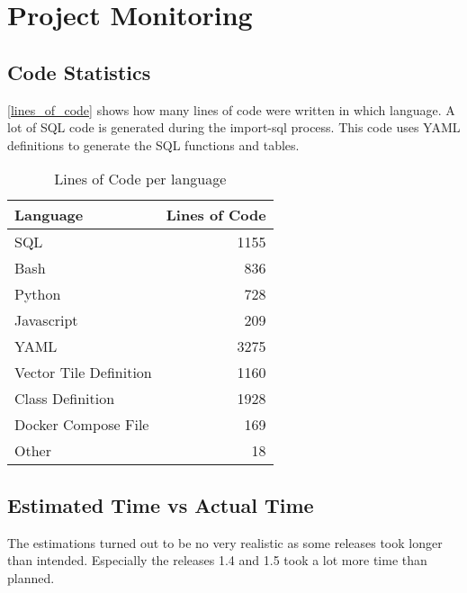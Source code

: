 \chapter{Project Monitoring}\label{project monitoring}

\section{Code Statistics}

\autoref{lines_of_code} shows how many lines of code were written in which language. A lot of SQL code is generated during the import-sql process. This code uses YAML definitions to generate the SQL functions and tables. 

\begin{table}[H]
\centering
\begin{tabular}{lr}
\textbf{Language}   & \multicolumn{1}{l}{\textbf{Lines of Code}} \\ \hline
SQL                     & 1155                              \\
Bash                    & 836                               \\
Python                  & 728                               \\
Javascript              & 209                               \\
YAML                    & 3275                              \\
\noindent\hspace*{8mm}%
Vector Tile Definition  & 1160                              \\
\noindent\hspace*{8mm}%
Class Definition        & 1928                              \\
\noindent\hspace*{8mm}%
Docker Compose File     & 169                               \\
\noindent\hspace*{8mm}%
Other                   & 18
\end{tabular}
\caption{Lines of Code per language}
\label{lines_of_code}
\end{table}

\section{Estimated Time vs Actual Time}

The estimations turned out to be no very realistic as some releases took longer than intended. Especially the releases 1.4 and 1.5 took a lot more time than planned.

